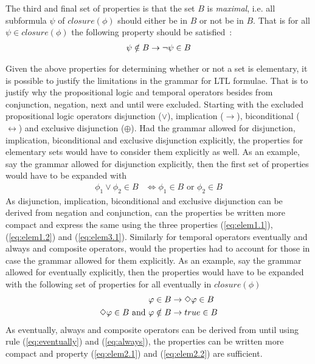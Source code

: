 The third and final set of properties is that the set $B$ is \emph{maximal}, i.e. all subformula $\psi$ of $closure(\phi)$ should either be in $B$ or not be in $B$. That is for all $\psi \in closure(\phi)$ the following property should be satisfied~\cite{baier2008principles}:
\begin{align}
    \psi \notin B \rightarrow \lnot \psi \in B \label{eq:elem3.1}
\end{align}

Given the above properties for determining whether or not a set is elementary, it is possible to justify the limitations in the grammar for LTL formulae. That is to justify why the propositional logic and temporal operators besides from conjunction, negation, next and until were excluded. Starting with the excluded propositional logic operators disjunction ($\lor$), implication ($\to$), biconditional ($\leftrightarrow$) and exclusive disjunction ($\oplus$). Had the grammar allowed for disjunction, implication, biconditional and exclusive disjunction explicitly, the properties for elementary sets would have to consider them explicitly as well. As an example, say the grammar allowed for disjunction explicitly, then the first set of properties would have to be expanded with
\begin{align*}
    \phi_1 \lor \phi_2 \in B &\Leftrightarrow \phi_1 \in B \text{ or } \phi_2 \in B
\end{align*}
As disjunction, implication, biconditional and exclusive disjunction can be derived from negation and conjunction, can the properties be written more compact and express the same using the three properties (\ref{eq:elem1.1}), (\ref{eq:elem1.2}) and (\ref{eq:elem3.1}). Similarly for temporal operators eventually and always and composite operators, would the properties had to account for those in case the grammar allowed for them explicitly. As an example, say the grammar allowed for eventually explicitly, then the properties would have to be expanded with the following set of properties for all eventually in $closure(\phi)$
\begin{align*}
    \varphi \in B &\rightarrow \Diamond \varphi \in B \\
    \Diamond \varphi \in B \text{ and } \varphi \notin B &\rightarrow true \in B \label{eq:elem2.2}
\end{align*}
As eventually, always and composite operators can be derived from until using rule (\ref{eq:eventually}) and (\ref{eq:always}), the properties can be written more compact and property (\ref{eq:elem2.1}) and (\ref{eq:elem2.2}) are sufficient.

